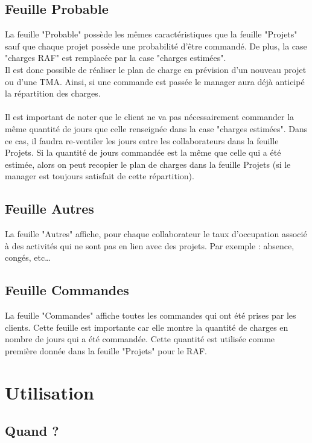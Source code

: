 \documentclass[french]{report}
\begin{document}
\subsection{Feuille Probable}

La feuille "Probable" possède les mêmes caractéristiques que la feuille
"Projets" sauf que chaque  projet possède une probabilité d’être commandé. De
plus, la case "charges RAF" est remplacée par la case "charges estimées".\\ Il
est donc possible de réaliser le plan de charge en  prévision d’un nouveau
projet ou d’une TMA.  Ainsi, si une commande est passée le manager aura déjà
anticipé la répartition des charges.\\\\ Il est important de noter que le client
ne va pas nécessairement commander la même quantité de jours que celle
renseignée dans la case "charges estimées". Dans ce cas, il faudra re-ventiler
les jours entre les collaborateurs dans la feuille Projets. Si la quantité de
jours commandée est la même que celle qui a été estimée, alors on peut recopier
le plan de charges dans la feuille Projets (si le manager est toujours
satisfait de cette répartition).

\subsection{Feuille Autres}

La feuille "Autres" affiche, pour chaque collaborateur le taux d'occupation
associé à des activités qui ne sont pas en lien avec des projets. Par exemple :
absence, congés, etc…

\subsection{Feuille Commandes}

La feuille "Commandes" affiche toutes les commandes qui ont été prises par les
clients. Cette feuille est importante car elle montre la quantité de charges en
nombre de jours qui a été commandée. Cette quantité est utilisée comme première
donnée dans la feuille "Projets" pour le RAF.

  \section{Utilisation}

\subsection{Quand ?}
\end{document}
